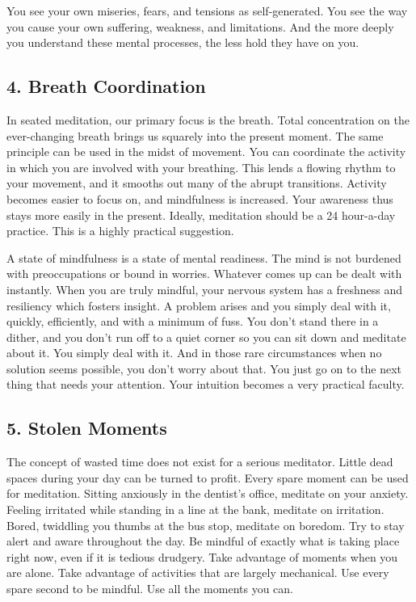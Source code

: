 You see your own miseries, fears, and tensions as self-generated. You see the
way you cause your own suffering, weakness, and limitations. And the more deeply
you understand these mental processes, the less hold they have on you.

\subsection*{4. Breath Coordination}

In seated meditation, our primary focus is the breath.  Total concentration on
the ever-changing breath brings us squarely into the present moment. The same
principle can be used in the midst of movement. You can coordinate the activity
in which you are involved with your breathing. This lends a flowing rhythm to
your movement, and it smooths out many of the abrupt transitions.  Activity
becomes easier to focus on, and mindfulness is increased. Your awareness thus
stays more easily in the present. Ideally, meditation should be a 24 hour-a-day
practice. This is a highly practical suggestion.

A state of mindfulness is a state of mental readiness. The mind is not burdened
with preoccupations or bound in worries.  Whatever comes up can be dealt with
instantly. When you are truly mindful, your nervous system has a freshness and
resiliency which fosters insight. A problem arises and you simply deal with it,
quickly, efficiently, and with a minimum of fuss. You don't stand there in a
dither, and you don't run off to a quiet corner so you can sit down and meditate
about it. You simply deal with it.  And in those rare circumstances when no
solution seems possible, you don't worry about that. You just go on to the next
thing that needs your attention. Your intuition becomes a very practical
faculty.

\subsection*{5. Stolen Moments}

The concept of wasted time does not exist for a serious meditator. Little dead
spaces during your day can be turned to profit. Every spare moment can be used
for meditation. Sitting anxiously in the dentist's office, meditate on your
anxiety. Feeling irritated while standing in a line at the bank, meditate on
irritation. Bored, twiddling you thumbs at the bus stop, meditate on boredom.
Try to stay alert and aware throughout the day. Be mindful of exactly what is
taking place right now, even if it is tedious drudgery. Take advantage of
moments when you are alone. Take advantage of activities that are largely
mechanical. Use every spare second to be mindful. Use all the moments you can.

